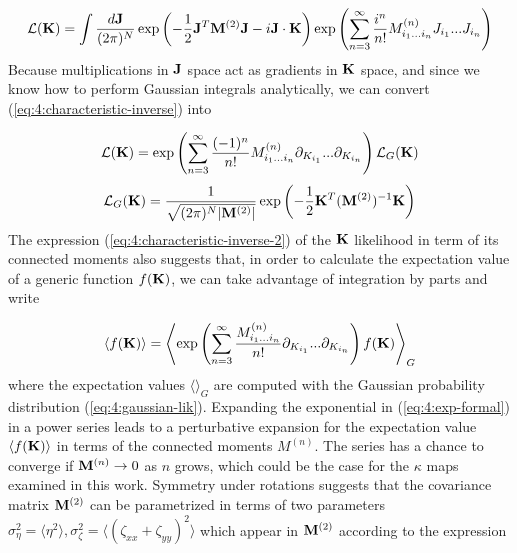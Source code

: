 \begin{equation}
\label{eq:4:characteristic-inverse}
\mathcal{L}(\mathbf{K}) = \int \frac{d\mathbf{J}}{(2\pi)^N}\exp\left(-\frac{1}{2}\mathbf{J}^T\mathbf{M}^{(2)}\mathbf{J}-i\mathbf{J}\cdot\mathbf{K}\right)\exp\left(\sum_{n=3}^\infty\frac{i^n}{n!}M^{(n)}_{i_1...i_n}J_{i_1}...J_{i_n}\right)
\end{equation} 
%
Because multiplications in $\mathbf{J}$ space act as gradients in $\mathbf{K}$ space, and since we know how to perform Gaussian integrals analytically, we can convert (\ref{eq:4:characteristic-inverse}) into  

\begin{equation}
\label{eq:4:characteristic-inverse-2}
\mathcal{L}(\mathbf{K}) = \exp\left(\sum_{n=3}^\infty\frac{(-1)^n}{n!}M^{(n)}_{i_1...i_n}\partial_{K_{i_1}}...\partial_{K_{i_n}}\right)\mathcal{L}_G(\mathbf{K})
\end{equation} 
%
\begin{equation}
\label{eq:4:gaussian-lik}
\mathcal{L}_G(\mathbf{K}) = \frac{1}{\sqrt{(2\pi)^N\vert\mathbf{M}^{(2)}\vert}}\exp\left(-\frac{1}{2}\mathbf{K}^T(\mathbf{M}^{(2)})^{-1}\mathbf{K}\right)
\end{equation}
%
The expression (\ref{eq:4:characteristic-inverse-2}) of the $\mathbf{K}$ likelihood in term of its connected moments also suggests that, in order to calculate the expectation value of a generic function $f(\mathbf{K})$, we can take advantage of integration by parts and write

\begin{equation}
\label{eq:4:exp-formal}
\langle f(\mathbf{K})\rangle = \left\langle\exp\left(\sum_{n=3}^\infty\frac{M^{(n)}_{i_1...i_n}}{n!}\partial_{K_{i_1}}...\partial_{K_{i_n}}\right)f(\mathbf{K})\right\rangle_G
\end{equation}
%
where the expectation values $\langle\rangle_G$ are computed with the Gaussian probability distribution (\ref{eq:4:gaussian-lik}). Expanding the exponential in (\ref{eq:4:exp-formal}) in a power series leads to a perturbative expansion for the expectation value $\langle f(\mathbf{K})\rangle$ in terms of the connected moments $M^{(n)}$. The series has a chance to converge if $\mathbf{M}^{(n)}\rightarrow 0$ as $n$ grows, which could be the case for the $\kappa$ maps examined in this work. Symmetry under rotations suggests that the covariance matrix $\mathbf{M}^{(2)}$ can be parametrized in terms of two parameters $\sigma^2_\eta=\langle\eta^2\rangle,\sigma^2_\zeta=\langle(\zeta_{xx}+\zeta_{yy})^2\rangle$ which appear in $\mathbf{M}^{(2)}$ according to the expression 

